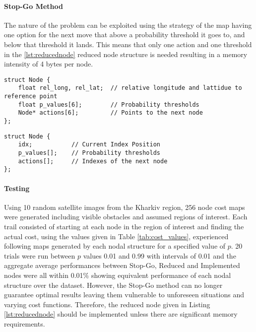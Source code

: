 \paragraph{Stop-Go Method}
The nature of the problem can be exploited using the strategy of the map having one option for the next move that above a probability threshold it goes to, and below that threshold it lands. This means that only one action and one threshold in the \ref{lst:reducednode} reduced node structure is needed resulting in a memory intensity of 4 bytes per node.
\begin{lstlisting}[caption={Implementated Node Structure},label={lst:node}]
struct Node {
    float rel_long, rel_lat;  // relative longitude and lattidue to reference point
    float p_values[6];        // Probability thresholds
    Node* actions[6];         // Points to the next node
};
\end{lstlisting}
\begin{lstlisting}[caption={Node Structure},label={lst:reducednode}]
struct Node {
    idx;           // Current Index Position
    p_values[];    // Probability thresholds
    actions[];     // Indexes of the next node
};
\end{lstlisting}

\paragraph{Testing}
Using 10 random satellite images from the Kharkiv region, 256 node cost maps were generated including visible obstacles and assumed regions of interest. Each trail consisted of starting at each node in the region of interest and finding the actual cost, using the values given in Table \ref{tab:cost_values}, experienced following maps generated by each nodal structure for a specified value of $p$. 20 trials were run between $p$ values 0.01 and 0.99 with intervals of 0.01 and the aggregate average performances between Stop-Go, Reduced and Implemented nodes were all within 0.01\% showing equivalent performance of each nodal structure over the dataset. However, the Stop-Go method can no longer guarantee optimal results leaving them vulnerable to unforeseen situations and varying cost functions. Therefore, the reduced node given in Listing \ref{lst:reducednode} should be implemented unless there are significant memory requirements.

